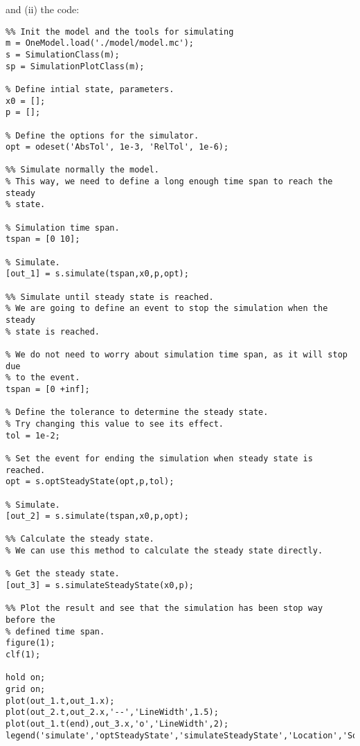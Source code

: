 \documentclass[11pt]{article}
\begin{document}
and (ii) the  code:

\begin{lstlisting}
%% Init the model and the tools for simulating
m = OneModel.load('./model/model.mc');
s = SimulationClass(m);
sp = SimulationPlotClass(m);

% Define intial state, parameters.
x0 = [];
p = [];

% Define the options for the simulator.
opt = odeset('AbsTol', 1e-3, 'RelTol', 1e-6);

%% Simulate normally the model.
% This way, we need to define a long enough time span to reach the steady
% state.

% Simulation time span.
tspan = [0 10]; 

% Simulate.
[out_1] = s.simulate(tspan,x0,p,opt);

%% Simulate until steady state is reached.
% We are going to define an event to stop the simulation when the steady
% state is reached.

% We do not need to worry about simulation time span, as it will stop due
% to the event.
tspan = [0 +inf]; 

% Define the tolerance to determine the steady state.
% Try changing this value to see its effect.
tol = 1e-2;

% Set the event for ending the simulation when steady state is reached.
opt = s.optSteadyState(opt,p,tol);

% Simulate.
[out_2] = s.simulate(tspan,x0,p,opt);

%% Calculate the steady state.
% We can use this method to calculate the steady state directly.

% Get the steady state.
[out_3] = s.simulateSteadyState(x0,p);

%% Plot the result and see that the simulation has been stop way before the 
% defined time span.
figure(1);
clf(1);

hold on;
grid on;
plot(out_1.t,out_1.x);
plot(out_2.t,out_2.x,'--','LineWidth',1.5);
plot(out_1.t(end),out_3.x,'o','LineWidth',2);
legend('simulate','optSteadyState','simulateSteadyState','Location','SouthEast');
\end{lstlisting}
\end{document}
